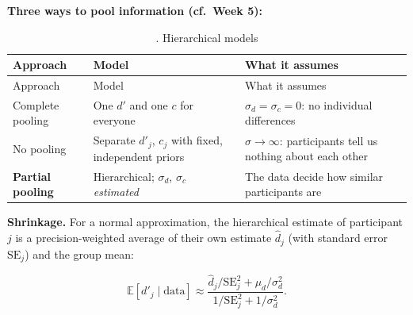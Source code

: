 \textbf{Three ways to pool information (cf.~Week 5):}

\begin{longtable}[]{@{}
  >{\raggedright\arraybackslash}p{}
  >{\raggedright\arraybackslash}p{}
  >{\raggedright\arraybackslash}p{}@{}}
\caption{. Hierarchical models}\tabularnewline
\toprule\noalign{}
\begin{minipage}[b]{\linewidth}\raggedright
Approach
\end{minipage} & \begin{minipage}[b]{\linewidth}\raggedright
Model
\end{minipage} & \begin{minipage}[b]{\linewidth}\raggedright
What it assumes
\end{minipage} \\
\midrule\noalign{}
\endfirsthead
\toprule\noalign{}
\begin{minipage}[b]{\linewidth}\raggedright
Approach
\end{minipage} & \begin{minipage}[b]{\linewidth}\raggedright
Model
\end{minipage} & \begin{minipage}[b]{\linewidth}\raggedright
What it assumes
\end{minipage} \\
\midrule\noalign{}
\endhead
\bottomrule\noalign{}
\endlastfoot
Complete pooling & One \(d'\) and one \(c\) for everyone &
\(\sigma_d = \sigma_c = 0\): no individual differences \\
No pooling & Separate \(d'_j\), \(c_j\) with fixed, independent priors &
\(\sigma \to \infty\): participants tell us nothing about each other \\
\textbf{Partial pooling} & Hierarchical; \(\sigma_d\), \(\sigma_c\)
\emph{estimated} & The data decide how similar participants are \\
\end{longtable}

\textbf{Shrinkage.} For a normal approximation, the hierarchical
estimate of participant \(j\) is a precision-weighted average of their
own estimate \(\hat d_j\) (with standard error \(\mathrm{SE}_j\)) and
the group mean:

\[
\mathbb{E}[d'_j \mid \text{data}] \approx \frac{\hat d_j/\mathrm{SE}_j^2 + \mu_d/\sigma_d^2}{1/\mathrm{SE}_j^2 + 1/\sigma_d^2}.
\]

